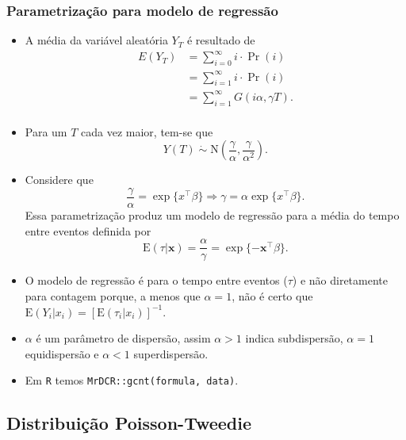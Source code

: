 \documentclass[10pt, aspectratio=169]{beamer}\usepackage[]{graphicx}\usepackage[]{color}
\begin{document}
\begin{frame}[allowframebreaks]
  \frametitle{Parametrização para modelo de regressão}
  \begin{itemize}
  \item A média da variável aleatória $Y_T$ é resultado de
    \begin{align*}
      E(Y_T) &= \sum_{i=0}^{\infty} i\cdot \Pr(i) \\
           &= \sum_{i=1}^{\infty} i\cdot \Pr(i)\\
           &= \sum_{i=1}^{\infty} G(i\alpha, \gamma T).\\
    \end{align*}
  \item Para um $T$ cada vez maior, tem-se que
    \begin{equation*}
      Y(T)\; \dot{\sim}\; \text{N}\left(
        \frac{\gamma}{\alpha},
        \frac{\gamma}{\alpha^2}\right).
    \end{equation*}
  \item Considere que
    $$\frac{\gamma}{\alpha} = \exp\{x^{\top}\beta\} \Rightarrow
    \gamma = \alpha \exp\{x^{\top}\beta\}.$$
    Essa parametrização produz um modelo de regressão para a média
    do tempo entre eventos definida por
    $$\text{E}(\tau|\boldsymbol{x}) = \frac{\alpha}{\gamma} =
    \exp\{-\boldsymbol{x}^{\top}\beta\}.$$
  \item O modelo de regressão é para o tempo entre eventos ($\tau$)
    e não diretamente para contagem porque, a menos que
    $\alpha = 1$, não é certo que
    $\text{E}(Y_i|x_i) = [\text{E}(\tau_i|x_i)]^{-1}$.
  \item $\alpha$ é um parâmetro de dispersão, assim $\alpha > 1$ indica
  subdispersão, $\alpha = 1$ equidispersão e $\alpha < 1$ superdispersão.
  \item Em \texttt{R} temos \texttt{MrDCR::gcnt(formula, data)}.
  \end{itemize}
  
\end{frame}

\subsection{Distribuição Poisson-Tweedie}
\end{document}
